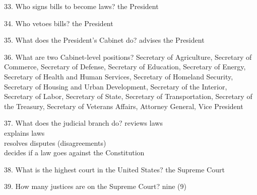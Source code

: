 \documentclass[avery5371,frame]{flashcards}
\begin{document}
        \begin{flashcard}{33. Who signs bills to become laws?}
        {the President}
        \end{flashcard}
        \begin{flashcard}{34. Who vetoes bills?}
        {the President}
        \end{flashcard}
        \begin{flashcard}{35. What does the President’s Cabinet do?}
        {advises the President}
        \end{flashcard}
        \begin{flashcard}{36. What are two Cabinet-level positions?}
        {Secretary of Agriculture\footnotesize, Secretary of Commerce\footnotesize, Secretary of Defense\footnotesize, Secretary of Education\footnotesize, Secretary of Energy\footnotesize, Secretary of Health and Human Services\footnotesize, Secretary of Homeland Security\footnotesize, Secretary of Housing and Urban Development\footnotesize, Secretary of the Interior\footnotesize, Secretary of Labor\footnotesize, Secretary of State\footnotesize, Secretary of Transportation\footnotesize, Secretary of the Treasury\footnotesize, Secretary of Veterans Affairs\footnotesize, Attorney General\footnotesize, Vice President}
        \end{flashcard}
        \begin{flashcard}{37. What does the judicial branch do?}
        {reviews laws\\explains laws\\resolves disputes (disagreements)\\decides if a law goes against the Constitution}
        \end{flashcard}
        \begin{flashcard}{38. What is the highest court in the United States?}
        {the Supreme Court}
        \end{flashcard}
        \begin{flashcard}{39. How many justices are on the Supreme Court?}
        {nine (9)}
        \end{flashcard}
\end{document}

